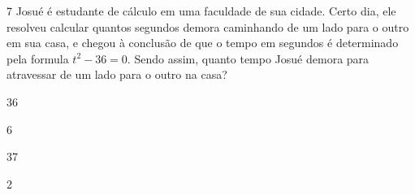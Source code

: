 


















\num{7} Josué é estudante de cálculo em uma faculdade de sua cidade. Certo
dia, ele resolveu calcular quantos segundos demora caminhando de um lado
para o outro em sua casa, e chegou à conclusão de que o tempo em
segundos é determinado pela formula $t^2 - 36 = 0$. Sendo assim, quanto
tempo Josué demora para atravessar de um lado para o outro na casa?

\begin{escolha}
\item 36
\item 6
\item 37
\item 2
\end{escolha}



